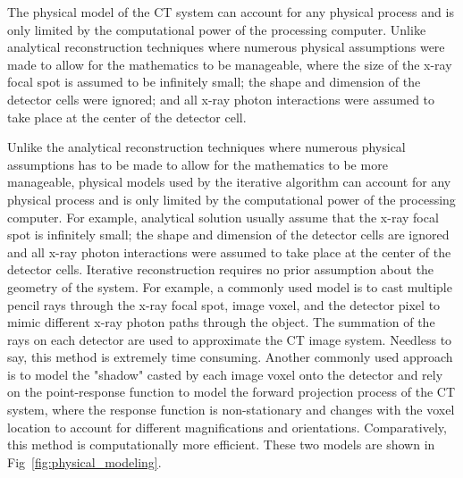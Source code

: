 The physical model of the CT system can account for any physical process and is only limited by the computational power of the processing computer.  Unlike analytical reconstruction techniques where numerous physical assumptions were made to allow for the mathematics to be manageable, where the size of the x-ray focal spot is assumed to be infinitely small; the shape and dimension of the detector cells were ignored; and all x-ray photon interactions were assumed to take place at the center of the detector cell.

Unlike the analytical reconstruction techniques where numerous physical assumptions has to be made to allow for the mathematics to be more manageable, physical models used by the iterative algorithm can account for any physical process and is only limited by the computational power of the processing computer.  For example, analytical solution usually assume that the x-ray focal spot is infinitely small; the shape and dimension of the detector cells are ignored and all x-ray photon interactions were assumed to take place at the center of the detector cells.  Iterative reconstruction requires no prior assumption about the geometry of the system.  For example, a commonly used model is to cast multiple pencil rays through the x-ray focal spot, image voxel, and the detector pixel to mimic different x-ray photon paths through the object.  The summation of the rays on each detector are used to approximate the CT image system. Needless to say, this method is extremely time consuming.  Another commonly used approach is to model the "shadow" casted by each image voxel onto the detector and rely on the point-response function to model the forward projection process of the CT system, where the response function is non-stationary and changes with the voxel location to account for different magnifications and orientations.  Comparatively, this method is computationally more efficient.  These two models are shown in Fig~\ref{fig:physical_modeling}.
%
%
%


